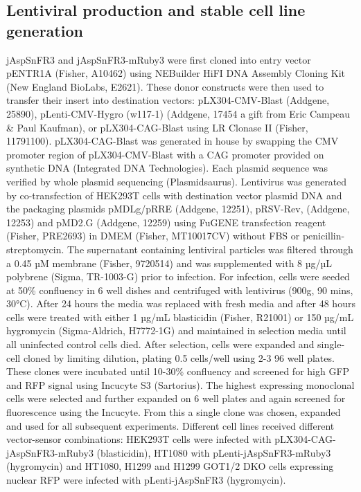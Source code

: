 \subsection{Lentiviral production and stable cell line generation}
jAspSnFR3 and jAspSnFR3-mRuby3 were first cloned into entry vector pENTR1A (Fisher, A10462) using NEBuilder HiFI DNA Assembly Cloning Kit (New England BioLabs, E2621).
These donor constructs were then used to transfer their insert into destination vectors: pLX304-CMV-Blast (Addgene, 25890), pLenti-CMV-Hygro (w117-1) (Addgene, 17454 a gift from Eric Campeau \& Paul Kaufman), or pLX304-CAG-Blast using LR Clonase II (Fisher, 11791100).
pLX304-CAG-Blast was generated in house by swapping the CMV promoter region of pLX304-CMV-Blast with a CAG promoter provided on synthetic DNA (Integrated DNA Technologies).
Each plasmid sequence was verified by whole plasmid sequencing (Plasmidsaurus).
Lentivirus was generated by co-transfection of HEK293T cells with destination vector plasmid DNA and the packaging plasmids pMDLg/pRRE (Addgene, 12251), pRSV-Rev, (Addgene, 12253) and pMD2.G (Addgene, 12259) using FuGENE transfection reagent (Fisher, PRE2693) in DMEM (Fisher, MT10017CV) without FBS or penicillin-streptomycin.
The supernatant containing lentiviral particles was filtered through a 0.45 µM membrane (Fisher, 9720514) and was supplemented with 8 µg/µL polybrene (Sigma, TR-1003-G) prior to infection.
For infection, cells were seeded at 50\% confluency in 6 well dishes and centrifuged with lentivirus (900g, 90 mins, 30°C).
After 24 hours the media was replaced with fresh media and after 48 hours cells were treated with either 1 µg/mL blasticidin (Fisher, R21001) or 150 µg/mL hygromycin (Sigma-Aldrich, H7772-1G) and maintained in selection media until all uninfected control cells died.
After selection, cells were expanded and single-cell cloned by limiting dilution, plating 0.5 cells/well using 2-3 96 well plates.
These clones were incubated until 10-30\% confluency and screened for high GFP and RFP signal using Incucyte S3 (Sartorius).
The highest expressing monoclonal cells were selected and further expanded on 6 well plates and again screened for fluorescence using the Incucyte.
From this a single clone was chosen, expanded and used for all subsequent experiments.
Different cell lines received different vector-sensor combinations: HEK293T cells were infected with pLX304-CAG-jAspSnFR3-mRuby3 (blasticidin), HT1080 with pLenti-jAspSnFR3-mRuby3 (hygromycin) and HT1080, H1299 and H1299 GOT1/2 DKO cells expressing nuclear RFP were infected with pLenti-jAspSnFR3 (hygromycin).

